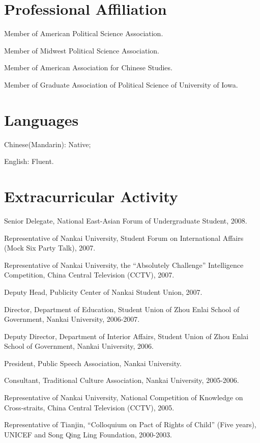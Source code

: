 \documentclass[letterpaper]{article}
\renewenvironment{itemize}{
  \begin{list}{}{
    \setlength{\leftmargin}{1.5em}
  }
}{
  \end{list}
}
\begin{document}
\section*{Professional Affiliation}
\begin{itemize}
\item Member of American Political Science Association.
\item Member of Midwest Political Science Association.
\item Member of American Association for Chinese Studies.
\item Member of Graduate Association of Political Science of University of Iowa.
\end{itemize}

\section*{Languages}
\begin{itemize}
\item Chinese(Mandarin): Native;
\item English: Fluent.
\end{itemize}

\section*{Extracurricular Activity}
\begin{itemize}
\item Senior Delegate, National East-Asian Forum of Undergraduate Student, 2008.
\item Representative of Nankai University, Student Forum on International Affairs (Mock Six Party Talk), 2007.
\item Representative of Nankai University, the ``Absolutely Challenge'' Intelligence Competition, China Central Television (CCTV), 2007.
\item Deputy Head, Publicity Center of Nankai Student Union, 2007.
\item Director, Department of Education, Student Union of Zhou Enlai School of Government, Nankai University, 2006-2007.
\item Deputy Director, Department of Interior Affairs, Student Union of Zhou Enlai School of Government, Nankai University, 2006.
\item President, Public Speech Association, Nankai University.
\item Consultant, Traditional Culture Association, Nankai University, 2005-2006.
\item Representative of Nankai University, National Competition of Knowledge on Cross-straits, China Central Television (CCTV), 2005.
\item Representative of Tianjin, ``Colloquium on Pact of Rights of Child'' (Five years), UNICEF and Song Qing Ling Foundation, 2000-2003.
\end{itemize}
\end{document}
